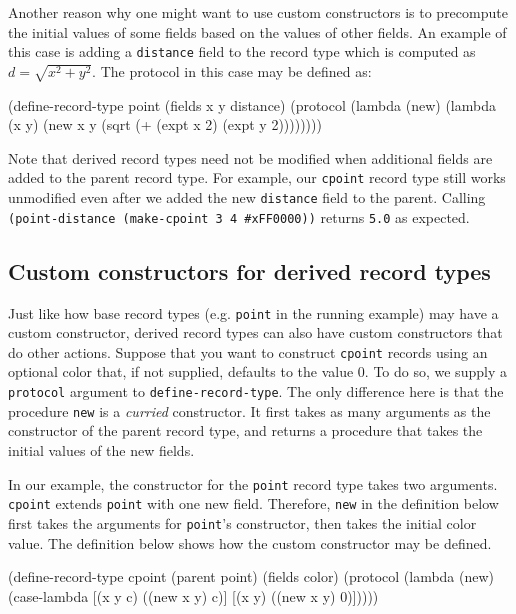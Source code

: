 \documentclass[onecolumn, 12pt, twoside, openright, dvipdfm]{book}
\begin{document}
Another reason why one might want to use custom constructors is to
precompute the initial values of some fields based on the values of
other fields.  An example of this case is adding a \texttt{distance}
field to the record type which is computed as
$d = \sqrt{x^2+y^2}$.  The protocol in this case may be defined as:

\begin{CodeInline}
(define-record-type point
  (fields x y distance)
  (protocol
    (lambda (new)
      (lambda (x y)
        (new x y (sqrt (+ (expt x 2) (expt y 2))))))))
\end{CodeInline}

Note that derived record types need not be modified when additional
fields are added to the parent record type.  For example, our
\texttt{cpoint} record type still works unmodified even after we
added the new \texttt{distance} field to the parent.  
Calling \texttt{(point-distance (make-cpoint 3 4 \#xFF0000))}
returns \texttt{5.0} as expected.

\subsection{Custom constructors for derived record types}

Just like how base record types (e.g. \texttt{point} in the running
example) may have a custom constructor, derived record types can
also have custom constructors that do other actions.  Suppose that
you want to construct \texttt{cpoint} records using an optional
color that, if not supplied, defaults to the value 0.  To do so, we
supply a \texttt{protocol} argument to \texttt{define-record-type}.
The only difference here is that the procedure \texttt{new} is a
\emph{curried} constructor.  It first takes as many arguments as the
constructor of the parent record type, and returns a procedure that
takes the initial values of the new fields.  

In our example, the constructor for the \texttt{point} record type
takes two arguments.  \texttt{cpoint} extends \texttt{point} with
one new field.  Therefore, \texttt{new} in the definition below
first takes the arguments for \texttt{point}'s constructor, then
takes the initial color value.  The definition below shows how the
custom constructor may be defined.

\newpage
\begin{CodeInline}
(define-record-type cpoint
  (parent point) 
  (fields color) 
  (protocol
    (lambda (new) 
      (case-lambda 
        [(x y c) ((new x y) c)]
        [(x y)   ((new x y) 0)]))))
\end{CodeInline}
\end{document}
